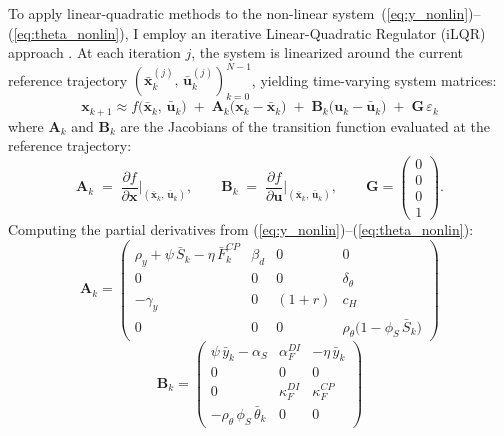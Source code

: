 To apply linear-quadratic methods to the non-linear
system~(\ref{eq:y_nonlin})--(\ref{eq:theta_nonlin}), I employ an iterative
Linear-Quadratic Regulator (iLQR) approach \citep{li2004iterative}. At each
iteration $j$, the system is linearized around the current reference trajectory
$(\bar{\bm{x}}_k^{(j)},\, \bar{\bm{u}}_k^{(j)})_{k=0}^{N-1}$, yielding
time-varying system matrices:
%
\begin{equation}
    \bm{x}_{k+1} \approx f\bigl(\bar{\bm{x}}_k,\, \bar{\bm{u}}_k\bigr)
    \;+\; \bm{A}_k\bigl(\bm{x}_k - \bar{\bm{x}}_k\bigr)
    \;+\; \bm{B}_k\bigl(\bm{u}_k - \bar{\bm{u}}_k\bigr)
    \;+\; \bm{G}\,\varepsilon_k
    \label{eq:linearization}
\end{equation}
%
where $\bm{A}_k$ and $\bm{B}_k$ are the Jacobians of the transition function
evaluated at the reference trajectory:
%
\begin{equation}
    \bm{A}_k \;=\; \frac{\partial f}{\partial \bm{x}}
    \bigg|_{(\bar{\bm{x}}_k,\, \bar{\bm{u}}_k)}, \qquad
    \bm{B}_k \;=\; \frac{\partial f}{\partial \bm{u}}
    \bigg|_{(\bar{\bm{x}}_k,\, \bar{\bm{u}}_k)}, \qquad
    \bm{G} = \begin{pmatrix} 0 \\ 0 \\ 0 \\ 1 \end{pmatrix}.
    \label{eq:jacobians_def}
\end{equation}
%
Computing the partial derivatives from
(\ref{eq:y_nonlin})--(\ref{eq:theta_nonlin}):
%
\begin{equation}
\bm{A}_k = \begin{pmatrix}
\rho_y + \psi\,\bar{S}_k - \eta\,\bar{F}_k^{CP}
    & \beta_d & 0 & 0 \\[3pt]
0 & 0 & 0 & \delta_\theta \\[3pt]
-\gamma_y & 0 & (1+r) & c_H \\[3pt]
0 & 0 & 0 & \rho_\theta\bigl(1 - \phi_S\,\bar{S}_k\bigr)
\end{pmatrix}
\label{eq:Ak}
\end{equation}
%
\begin{equation}
\bm{B}_k = \begin{pmatrix}
\psi\,\bar{y}_k - \alpha_S
    & \alpha_F^{DI}
    & -\eta\,\bar{y}_k \\[3pt]
0 & 0 & 0 \\[3pt]
0 & \kappa_F^{DI} & \kappa_F^{CP} \\[3pt]
-\rho_\theta\,\phi_S\,\bar{\theta}_k & 0 & 0
\end{pmatrix}
\label{eq:Bk}
\end{equation}

